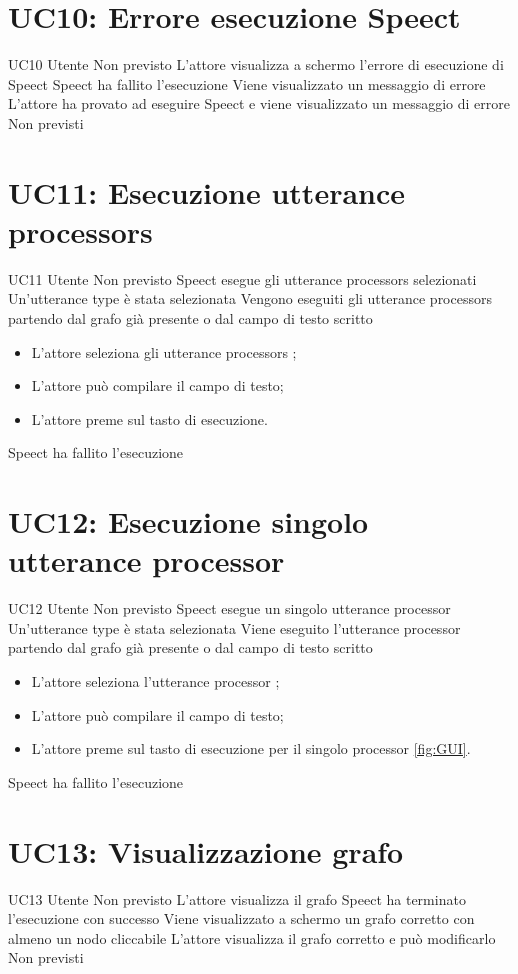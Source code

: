 \documentclass[../AnalisideiRequisiti.tex]{subfiles}
\begin{document}
\section{UC10: Errore esecuzione Speect}
\UserCase
{UC10}
{Utente}
{Non previsto}
{L'attore visualizza a schermo l'errore di esecuzione di Speect}
{Speect ha fallito l'esecuzione}
{Viene visualizzato un messaggio di errore}
{L'attore ha provato ad eseguire Speect e viene visualizzato un messaggio di errore}
{Non previsti}

\section{UC11: Esecuzione utterance processors}
\UserCase
{UC11}
{Utente}
{Non previsto}
{Speect esegue gli utterance processors selezionati}
{Un'utterance type è stata selezionata  }
{Vengono eseguiti gli utterance processors partendo dal grafo già presente o dal campo di testo scritto}
{
	\begin{itemize}
		\item{} L'attore seleziona gli utterance processors ;
		\item{} L'attore può compilare il campo di testo;
		\item{} L'attore preme sul tasto di esecuzione.
	\end{itemize}
}
{Speect ha fallito l'esecuzione}

\section{UC12: Esecuzione singolo utterance processor}
\UserCase
{UC12}
{Utente}
{Non previsto}
{Speect esegue un singolo utterance processor}
{Un'utterance type è stata selezionata  }
{Viene eseguito l'utterance processor partendo dal grafo già presente o dal campo di testo scritto}
{
	\begin{itemize}
		\item{} L'attore seleziona l'utterance processor ;
		\item{} L'attore può compilare il campo di testo;
		\item{} L'attore preme sul tasto di esecuzione per il singolo processor \ref{fig:GUI}.
	\end{itemize}
}
{Speect ha fallito l'esecuzione}

\section{UC13: Visualizzazione grafo}
\UserCase
{UC13}
{Utente}
{Non previsto}
{L'attore visualizza il grafo}
{Speect ha terminato l'esecuzione con successo }
{Viene visualizzato a schermo un grafo corretto con almeno un nodo cliccabile}
{
	L'attore visualizza il grafo corretto e può modificarlo 
}
{Non previsti}
\end{document}
